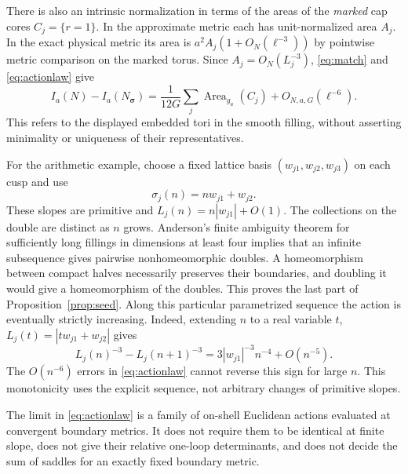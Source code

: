 \documentclass[11pt]{article}
\theoremstyle{remark}
\begin{document}
There is also an intrinsic normalization in terms of the areas of the \emph{marked} cap cores \(C_j=\{r=1\}\). In the approximate metric each has unit-normalized area \(A_j\). In the exact physical metric its area is \(a^2 A_j(1+O_N(\ell^{-3}))\) by pointwise metric comparison on the marked torus. Since \(A_j=O_N(L_j^{-3})\), \eqref{eq:match} and \eqref{eq:actionlaw} give
\begin{equation}\label{eq:core}
 I_a(N)-I_a(N_{\boldsymbol\sigma})
   =\frac1{12G}\sum_j \operatorname{Area}_{g_a}(C_j)
      +O_{N,a,G}(\ell^{-6}).
\end{equation}
This refers to the displayed embedded tori in the smooth filling, without asserting minimality or uniqueness of their representatives.

For the arithmetic example, choose a fixed lattice basis \((w_{j1},w_{j2},w_{j3})\) on each cusp and use
\[
 \sigma_j(n)=n w_{j1}+w_{j2}.
\]
These slopes are primitive and \(L_j(n)=n|w_{j1}|+O(1)\). The collections on the double are distinct as \(n\) grows. Anderson's finite ambiguity theorem for sufficiently long fillings in dimensions at least four \cite[Proposition~3.9]{anderson} implies that an infinite subsequence gives pairwise nonhomeomorphic doubles. A homeomorphism between compact halves necessarily preserves their boundaries, and doubling it would give a homeomorphism of the doubles. This proves the last part of Proposition~\ref{prop:seed}. Along this particular parametrized sequence the action is eventually strictly increasing. Indeed, extending \(n\) to a real variable \(t\), \(L_j(t)=|t w_{j1}+w_{j2}|\) gives
\[
 L_j(n)^{-3}-L_j(n+1)^{-3}
 =3|w_{j1}|^{-3}n^{-4}+O(n^{-5}).
\]
The \(O(n^{-6})\) errors in \eqref{eq:actionlaw} cannot reverse this sign for large \(n\). This monotonicity uses the explicit sequence, not arbitrary changes of primitive slopes.

The limit in \eqref{eq:actionlaw} is a family of on-shell Euclidean actions evaluated at convergent boundary metrics. It does not require them to be identical at finite slope, does not give their relative one-loop determinants, and does not decide the sum of saddles for an exactly fixed boundary metric.
\end{document}
